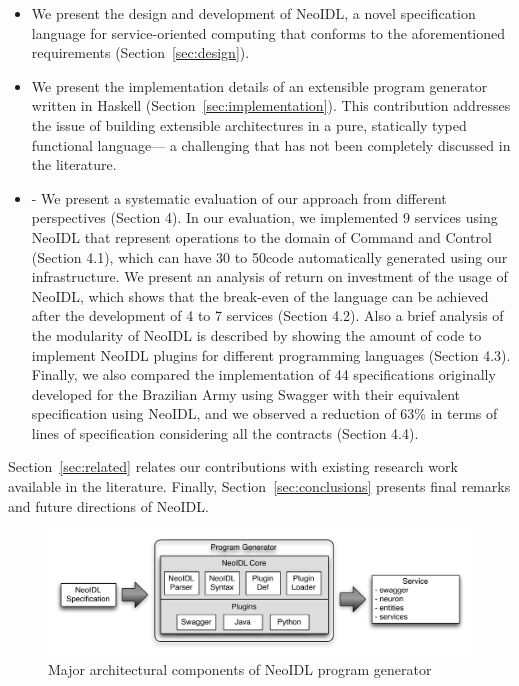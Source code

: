 \documentclass{ws-ijseke}
\newcommand{\neoidl}{NeoIDL}
\begin{document}
\begin{itemize}

\item We present the design
and development of NeoIDL, a novel specification language for 
service-oriented computing that conforms to the aforementioned
requirements (Section~\ref{sec:design}).  

\item We present the implementation details of an extensible 
program generator written in Haskell
(Section~\ref{sec:implementation}). 
This contribution addresses the
issue of building extensible architectures in
a pure, statically typed functional language--- a challenging 
that has not been completely discussed in the literature.  

\item - We present a systematic evaluation of our approach from different
perspectives (Section 4).  In our evaluation, we implemented 9
services using NeoIDL that represent operations to the domain of
Command and Control (Section 4.1), which can have 30 to 50code automatically generated using our infrastructure. We present an
analysis of return on investment of the usage of NeoIDL, which shows
that the break-even of the language can be achieved after the
development of 4 to 7 services (Section 4.2). Also a brief analysis of
the modularity of NeoIDL is described by showing the amount of code to
implement NeoIDL plugins for different programming languages (Section
4.3). Finally, we also compared the implementation of 44
specifications originally developed for the Brazilian Army using
Swagger with their equivalent specification using NeoIDL, and we
observed a reduction of 63\% in terms of lines of specification
considering all the contracts (Section 4.4).

\end{itemize}

Section~\ref{sec:related} relates our contributions with existing research work
available in the literature. Finally, Section~\ref{sec:conclusions} presents final remarks and future
directions of \neoidl.
\begin{figure}[bt]
\begin{center}
\includegraphics[scale=0.55,trim=0cm 1.5cm 0cm 0cm]{programgenerator.pdf}
\vspace{-.5cm}
\end{center}
\caption{Major architectural components of \neoidl{} program generator}
\label{fig:programGenerator}
\end{figure}
\end{document}
